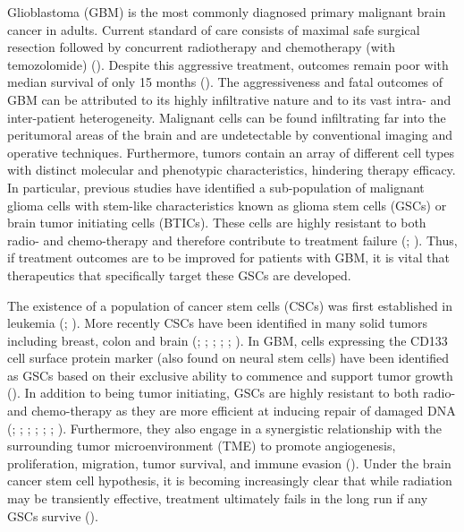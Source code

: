 \documentclass[
  letterpaper,
]{scrreprt}
\theoremstyle{definition}
\theoremstyle{remark}
\begin{document}
Glioblastoma (GBM) is the most commonly diagnosed primary malignant
brain cancer in adults. Current standard of care consists of maximal
safe surgical resection followed by concurrent radiotherapy and
chemotherapy (with temozolomide) (). Despite this aggressive treatment, outcomes remain poor with
median survival of only 15 months (). The aggressiveness and fatal outcomes of GBM can be
attributed to its highly infiltrative nature and to its vast intra- and
inter-patient heterogeneity. Malignant cells can be found infiltrating
far into the peritumoral areas of the brain and are undetectable by
conventional imaging and operative techniques. Furthermore, tumors
contain an array of different cell types with distinct molecular and
phenotypic characteristics, hindering therapy efficacy. In particular,
previous studies have identified a sub-population of malignant glioma
cells with stem-like characteristics known as glioma stem cells (GSCs)
or brain tumor initiating cells (BTICs). These cells are highly
resistant to both radio- and chemo-therapy and therefore contribute to
treatment failure (;
). Thus, if treatment
outcomes are to be improved for patients with GBM, it is vital that
therapeutics that specifically target these GSCs are developed.

The existence of a population of cancer stem cells (CSCs) was first
established in leukemia (; ). More recently
CSCs have been identified in many solid tumors including breast, colon
and brain (;
;
;
;
;
). In GBM, cells expressing
the CD133 cell surface protein marker (also found on neural stem cells)
have been identified as GSCs based on their exclusive ability to
commence and support tumor growth (). In addition to being tumor initiating, GSCs are highly resistant
to both radio- and chemo-therapy as they are more efficient at inducing
repair of damaged DNA (;
; ; ;
;
;
). Furthermore, they also engage in
a synergistic relationship with the surrounding tumor microenvironment
(TME) to promote angiogenesis, proliferation, migration, tumor survival,
and immune evasion (). Under the
brain cancer stem cell hypothesis, it is becoming increasingly clear
that while radiation may be transiently effective, treatment ultimately
fails in the long run if any GSCs survive
().
\end{document}
